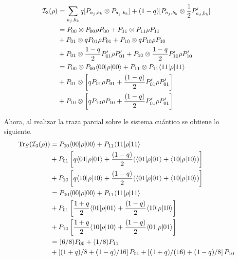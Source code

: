 \begin{equation}\label{tercera_alternativa_ejemplo1}
    \begin{split}
        \mathcal{I}_3(\rho)&=\sum_{a_j,b_k} q [P_{a_j,b_k}\otimes P_{a_j,b_k}]+ (1-q)[P_{a_j,b_k}\otimes \frac{1}{2} P'_{a_j,b_k}]\\
        &=P_{00}\otimes P_{00}\rho P_{00} + P_{11}\otimes P_{11} \rho P_{11}\\
        &+P_{01} \otimes qP_{01}\rho P_{01} +P_{10}\otimes q P_{10}\rho P_{10} \\
        &+P_{01} \otimes \frac{1-q}{2}P'_{01}\rho P'_{01}+P_{10}\otimes \frac{1-q}{2}P'_{10}\rho P'_{10}\\
        &=P_{00}\otimes P_{00} \langle 00|\rho|00\rangle + P_{11}\otimes P_{11} \langle 11|\rho|11\rangle\\
        &+P_{01} \otimes \left[qP_{01}\rho P_{01}+ \frac{(1-q)}{2} P'_{01}\rho P'_{01}\right] \\
        &+P_{10}\otimes \left[qP_{10}\rho P_{10}+ \frac{(1-q)}{2} P'_{01}\rho P'_{01}\right]\\
    \end{split}
\end{equation}

Ahora, al realizar la traza parcial sobre le sistema cuántico se obtiene lo siguiente. 
\begin{equation}\label{traza_S3_ejemplo1}
    \begin{split}
        {\rm Tr}_S(\mathcal{I}_3(\rho)) 
        &=P_{00} \langle 00|\rho|00\rangle + P_{11} \langle 11|\rho|11\rangle\\
        &+P_{01}  \left[q \langle 01|\rho| 01\rangle+ \frac{(1-q)}{2} (\langle 01|\rho |01\rangle +\langle 10 |\rho |10\rangle)\right] \\
        &+P_{10}  \left[q \langle 10|\rho| 10\rangle+ \frac{(1-q)}{2} (\langle 01|\rho| 01\rangle +\langle 10 |\rho |10\rangle)\right] \\
        &=P_{00} \langle 00|\rho|00\rangle + P_{11} \langle 11|\rho|11\rangle\\
        &+P_{01}  \left[\frac{1+q}{2}\langle 01|\rho| 01\rangle+ \frac{(1-q)}{2} \langle 10 |\rho |10\rangle\right] \\
        &+P_{10}  \left[\frac{1+q}{2}\langle 10|\rho| 10\rangle+ \frac{(1-q)}{2} \langle 01 |\rho |01\rangle\right] \\
        &=(6/8)P_{00} + (1/8)P_{11}\\
        &+  \left[(1+q)/8+ (1-q)/16\right] P_{01}+  \left[(1+q)/(16)+ (1-q)/8 \right] P_{10}\\
    \end{split}
\end{equation}

